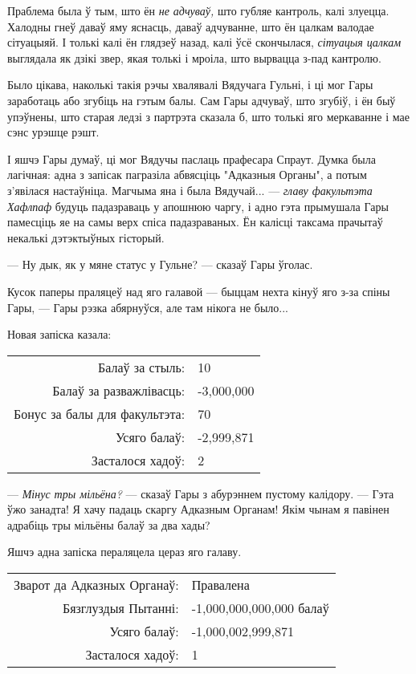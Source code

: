 Праблема была ў тым, што ён \emph{не адчуваў,} што губляе кантроль, калі злуецца.
Халодны гнеў даваў яму яснасць, даваў адчуванне, што ён цалкам валодае сітуацыяй.
І толькі калі ён глядзеў назад, калі ўсё скончылася, \emph{сітуацыя цалкам}
выглядала як дзікі звер, якая толькі і мроіла, што вырвацца з-пад кантролю.

Было цікава, наколькі такія рэчы хвалявалі Вядучага Гульні, і ці мог Гары 
заработаць або згубіць на гэтым балы. Сам Гары адчуваў, што згубіў, і 
ён быў упэўнены, што старая ледзі з партрэта сказала б, што толькі яго меркаванне 
і мае сэнс урэшце рэшт. 

І яшчэ Гары думаў, ці мог Вядучы паслаць прафесара Спраут. Думка была лагічная:
адна з запісак пагразіла абвясціць "Адказныя Органы", а потым з'явілася настаўніца.
Магчыма яна і была Вядучай... ---  \emph{главу факультэта Хафлпаф} будуць падазраваць 
у апошнюю чаргу, і адно гэта прымушала Гары памесціць яе на самы верх спіса падазраваных.
Ён калісці таксама прачытаў некалькі дэтэктыўных гісторый.

--- Ну дык, як у мяне статус у Гульне? --- сказаў Гары ўголас.

Кусок паперы праляцеў над яго галавой --- быццам нехта кінуў яго з-за спіны Гары, ---
Гары рэзка абярнуўся, але там нікога не было...

Новая запіска казала: 


\begin{writtenNoteGame}
\begin{tabular}{rl}
Балаў за стыль: & 10\\
Балаў за разважлівасць: & -3,000,000\\
Бонус за балы для факультэта: & 70\\
Усяго балаў: & -2,999,871\\
Засталося хадоў: & 2
\end{tabular}
\end{writtenNoteGame}

--- \emph{Мінус тры мільёна?} --- сказаў Гары з абурэннем пустому калідору. --- 
Гэта ўжо занадта! Я хачу падаць скаргу Адказным Органам! Якім чынам я павінен 
адрабіць тры мільёны балаў за два хады?

Яшчэ адна запіска пераляцела цераз яго галаву.

\begin{writtenNoteGame}
\begin{tabular}{rl}
Зварот да Адказных Органаў: & Правалена\\
Бязглуздыя Пытанні: & -1,000,000,000,000 балаў\\
Усяго балаў: & -1,000,002,999,871\\
Засталося хадоў: & 1
\end{tabular}
\end{writtenNoteGame}


